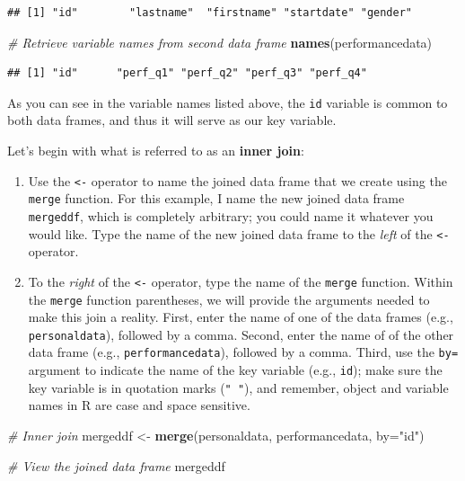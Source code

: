 \documentclass[]{book}
\newenvironment{Shaded}{\begin{snugshade}}{\end{snugshade}}
\newcommand{\KeywordTok}[1]{\textcolor[rgb]{0.13,0.29,0.53}{\textbf{#1}}}
\newcommand{\DataTypeTok}[1]{\textcolor[rgb]{0.13,0.29,0.53}{#1}}
\newcommand{\StringTok}[1]{\textcolor[rgb]{0.31,0.60,0.02}{#1}}
\newcommand{\CommentTok}[1]{\textcolor[rgb]{0.56,0.35,0.01}{\textit{#1}}}
\newcommand{\NormalTok}[1]{#1}
\providecommand{\tightlist}{%
  \setlength{\itemsep}{0pt}\setlength{\parskip}{0pt}}
\begin{document}
\begin{verbatim}
## [1] "id"        "lastname"  "firstname" "startdate" "gender"
\end{verbatim}

\begin{Shaded}
\begin{Highlighting}[]
\CommentTok{# Retrieve variable names from second data frame}
\KeywordTok{names}\NormalTok{(performancedata)}
\end{Highlighting}
\end{Shaded}

\begin{verbatim}
## [1] "id"      "perf_q1" "perf_q2" "perf_q3" "perf_q4"
\end{verbatim}

As you can see in the variable names listed above, the \texttt{id}
variable is common to both data frames, and thus it will serve as our
key variable.

Let's begin with what is referred to as an \textbf{inner join}:

\begin{enumerate}
\def\labelenumi{\arabic{enumi}.}
\tightlist
\item
  Use the \texttt{\textless{}-} operator to name the joined data frame
  that we create using the \texttt{merge} function. For this example, I
  name the new joined data frame \texttt{mergeddf}, which is completely
  arbitrary; you could name it whatever you would like. Type the name of
  the new joined data frame to the \emph{left} of the
  \texttt{\textless{}-} operator.
\item
  To the \emph{right} of the \texttt{\textless{}-} operator, type the
  name of the \texttt{merge} function. Within the \texttt{merge}
  function parentheses, we will provide the arguments needed to make
  this join a reality. First, enter the name of one of the data frames
  (e.g., \texttt{personaldata}), followed by a comma. Second, enter the
  name of of the other data frame (e.g., \texttt{performancedata}),
  followed by a comma. Third, use the \texttt{by=} argument to indicate
  the name of the key variable (e.g., \texttt{id}); make sure the key
  variable is in quotation marks (\texttt{"\ "}), and remember, object
  and variable names in R are case and space sensitive.
\end{enumerate}

\begin{Shaded}
\begin{Highlighting}[]
\CommentTok{# Inner join}
\NormalTok{mergeddf <-}\StringTok{ }\KeywordTok{merge}\NormalTok{(personaldata, performancedata, }\DataTypeTok{by=}\StringTok{"id"}\NormalTok{)}

\CommentTok{# View the joined data frame}
\NormalTok{mergeddf}
\end{Highlighting}
\end{Shaded}
\end{document}
